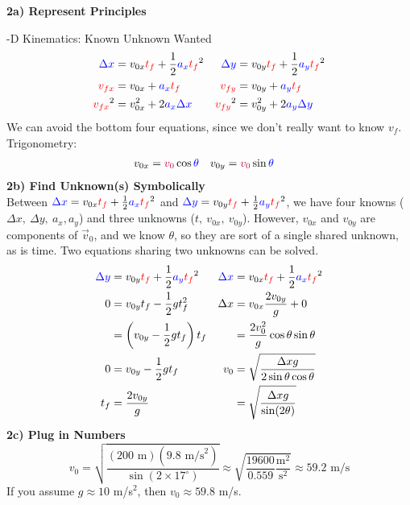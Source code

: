 \documentclass[]{article}
\begin{document}
\begin{TeacherMargin}
\noindent\textbf{2a) Represent Principles}

-D Kinematics: {\color{blue}Known} {\color{red}Unknown} {\color{purple}Wanted}
\begin{align*}
	{\color{blue}\Delta x} & = v_{0x}{\color{red}t_{f}} + \frac{1}{2}{\color{blue}a_{x}}{\color{red}t_{f}}^{2} & {\color{blue}\Delta y} & = v_{0y}{\color{red}t_{f}} + \frac{1}{2}{\color{blue}a_{y}}{\color{red}t_{f}}^{2} \\
	{\color{red}v_{fx}} & = v_{0x} + {\color{blue}a_{x}}{\color{red}t_{f}} & {\color{red}v_{fy}} & = v_{0y}+{\color{blue}a_{y}}{\color{red}t_{f}} \\
	{\color{red}v_{fx}}^{2} & = v_{0x}^{2} + 2{\color{blue}a_{x}}{\color{blue}\Delta x} & {\color{red}v_{fy}}^{2} & = v_{0y}^{2} + 2{\color{blue}a_{y}}{\color{blue}\Delta y}
\end{align*}
We can avoid the bottom four equations, since we don't really want to know $v_{f}$. \\
Trigonometry:
\begin{align*}
	v_{0x} & = {\color{purple}v_{0}} \cos{\color{blue}\theta} & v_{0y} & = {\color{purple}v_{0}} \sin{\color{blue}\theta}
\end{align*}
\textbf{2b) Find Unknown(s) Symbolically} \\
Between ${\color{blue}\Delta x} = v_{0x}{\color{red}t_{f}} + \frac{1}{2}{\color{blue}a_{x}}{\color{red}t_{f}}^{2}$ and ${\color{blue}\Delta y} = v_{0y}{\color{red}t_{f}} + \frac{1}{2}{\color{blue}a_{y}}{\color{red}t_{f}}^{2}$, we have four knowns ($\Delta x,\ \Delta y,\ a_{x}, a_{y}$) and three unknowns ($t,\ v_{0x},\ v_{0y}$). However, $v_{0x}$ and $v_{0y}$ are components of $\vec{v}_{0}$, and we know $\theta$, so they are sort of a single shared unknown, as is time. Two equations sharing two unknowns can be solved.
\begin{align*}
	{\color{blue}\Delta y} & = v_{0y}{\color{red}t_{f}} + \frac{1}{2}{\color{blue}a_{y}}{\color{red}t_{f}}^{2} & {\color{blue}\Delta x} & = v_{0x}{\color{red}t_{f}} + \frac{1}{2}{\color{blue}a_{x}}{\color{red}t_{f}}^{2} \\
	0 & = v_{0y}t_{f} - \frac{1}{2}gt_{f}^{2} & \Delta x & = v_{0x}\frac{2v_{0y}}{g} + 0 \\
	& = \left(v_{0y} - \frac{1}{2}gt_{f}\right)t_{f} & & = \frac{2v_{0}^{2}}{g}\cos\theta\sin\theta \\
	0 & = v_{0y} - \frac{1}{2}gt_{f} & v_{0} & = \sqrt{\frac{\Delta x g}{2\sin\theta\cos\theta}} \\
	t_{f} & = \frac{2v_{0y}}{g} & & = \sqrt{\frac{\Delta x g}{\sin(2\theta)}}
\end{align*}
\textbf{2c) Plug in Numbers}
\[
v_{0} = \sqrt{\frac{(200\text{ m})(9.8\text{ m/s}^{2})}{\sin(2\times17^{\circ})}} \approx \sqrt{\frac{19600}{0.559}\frac{\text{m}^{2}}{\text{s}^{2}}} \approx 59.2 \text{ m/s}
\]
If you assume $g \approx 10$ m/s$^{2}$, then $v_{0}\approx59.8$ m/s.
\end{TeacherMargin}
\end{document}
